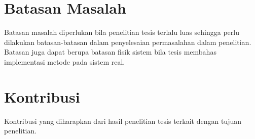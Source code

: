 \section{Batasan Masalah}

Batasan masalah diperlukan bila penelitian tesis terlalu luas sehingga perlu dilakukan batasan-batasan dalam penyelesaian permasalahan dalam penelitian. Batasan juga dapat berupa batasan fisik sistem bila tesis membahas implementasi metode pada sistem real.

\section{Kontribusi}
Kontribusi yang diharapkan dari hasil penelitian tesis terkait dengan tujuan penelitian.